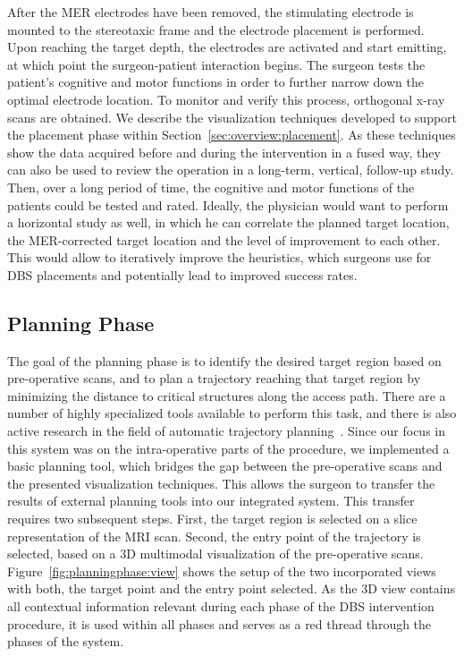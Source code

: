 \documentclass{vgtc}                          %
\begin{document}
After the MER electrodes have been removed, the stimulating electrode is mounted to the stereotaxic frame and the electrode placement is performed. Upon reaching the target depth, the electrodes are activated and start emitting, at which point the surgeon-patient interaction begins. The surgeon tests the patient's cognitive and motor functions in order to further narrow down the optimal electrode location. To monitor and verify this process, orthogonal x-ray scans are obtained. We describe the visualization techniques developed to support the placement phase within Section~\ref{sec:overview:placement}. As these techniques show the data acquired before and during the intervention in a fused way, they can also be used to review the operation in a long-term, vertical, follow-up study. Then, over a long period of time, the cognitive and motor functions of the patients could be tested and rated. Ideally, the physician would want to perform a horizontal study as well, in which he can correlate the planned target location, the MER-corrected target location and the level of improvement to each other. This would allow to iteratively improve the heuristics, which surgeons use for DBS placements and potentially lead to improved success rates.


\subsection{Planning Phase}\label{sec:overview:planning}
The goal of the planning phase is to identify the desired target region based on pre-operative scans, and to plan a trajectory reaching that target region by minimizing the distance to critical structures along the access path. There are a number of highly specialized tools available to perform this task, and there is also active research in the field of automatic trajectory planning~\cite{Shamir2010}. Since our focus in this system was on the intra-operative parts of the procedure, we implemented a basic planning tool, which bridges the gap between the pre-operative scans and the presented visualization techniques. This allows the surgeon to transfer the results of external planning tools into our integrated system. This transfer requires two subsequent steps. First, the target region is selected on a slice representation of the MRI scan. Second, the entry point of the trajectory is selected, based on a 3D multimodal visualization of the pre-operative scans. Figure~\ref{fig:planningphase:view} shows the setup of the two incorporated views with both, the target point and the entry point selected. As the 3D view contains all contextual information relevant during each phase of the DBS intervention procedure, it is used within all phases and serves as a red thread through the phases of the system.
\end{document}
